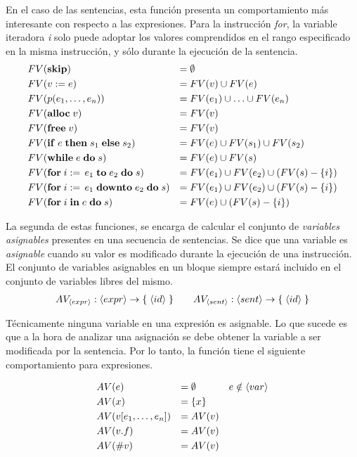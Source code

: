 \documentclass{article}
\begin{document}
En el caso de las sentencias, esta función presenta un comportamiento más interesante con respecto a las expresiones.
Para la instrucción \textit{for}, la variable iteradora \textit{i} solo puede adoptar los valores comprendidos en el rango especificado en la misma instrucción, y sólo durante la ejecución de la sentencia.
\begin{align*}
&FV(\mathbf{skip})
&=&\;
\emptyset
\\
&FV(v := e)
&=&\;
FV(v) \cup FV(e)
\\
&FV(p(e_1, \ldots, e_n))
&=&\;
FV(e_1) \cup \ldots \cup FV(e_n)
\\
&FV(\mathbf{alloc} \; v)
&=&\;
FV(v)
\\
&FV(\mathbf{free} \; v)
&=&\;
FV(v)
\\
&FV(\mathbf{if} \; e \; \mathbf{then} \; s_1 \; \mathbf{else} \; s_2)
&=&\;
FV(e) \cup FV(s_1) \cup FV(s_2)
\\
&FV(\mathbf{while} \; e \; \mathbf{do} \; s)
&=&\;
FV(e) \cup FV(s)
\\
&FV(\mathbf{for} \; i := \, e_1 \; \mathbf{to} \; e_2 \; \mathbf{do} \; s)
&=&\;
FV(e_1) \cup FV(e_2) \cup (FV(s) - \{ i \})
\\
&FV(\mathbf{for} \; i := \, e_1 \; \mathbf{downto} \; e_2 \; \mathbf{do} \; s)
&=&\;
FV(e_1) \cup FV(e_2) \cup (FV(s) - \{ i \})
\\
&FV(\mathbf{for} \; i \; \mathbf{in} \; e \; \mathbf{do} \; s)
&=&\;
FV(e) \cup (FV(s) - \{ i \})
\end{align*}

La segunda de estas funciones, se encarga de calcular el conjunto de \textit{variables asignables} presentes en una secuencia de sentencias.
Se dice que una variable es \textit{asignable} cuando su valor es modificado durante la ejecución de una instrucción.
El conjunto de variables asignables en un bloque siempre estará incluido en el conjunto de variables libres del mismo.
\begin{gather*}
AV_{\langle expr \rangle}: \langle expr \rangle \rightarrow \{ \; \langle id \rangle \; \}
\qquad
AV_{\langle sent \rangle}: \langle sent \rangle \rightarrow \{ \; \langle id \rangle \; \}
\end{gather*}

Técnicamente ninguna variable en una expresión es asignable.
Lo que sucede es que a la hora de analizar una asignación se debe obtener la variable a ser modificada por la sentencia.
Por lo tanto, la función tiene el siguiente comportamiento para expresiones.


\begin{align*}
&AV(e)
&=&\;
\emptyset
&e \notin \langle var \rangle
\\
&AV(x)
&=&\;
\{ x \}
\\
&AV(v [e_1, \ldots, e_n])
&=&\;
AV(v)
\\
&AV(v.f)
&=&\;
AV(v)
\\
&AV(\# v)
&=&\;
AV(v)
\end{align*}
\end{document}

